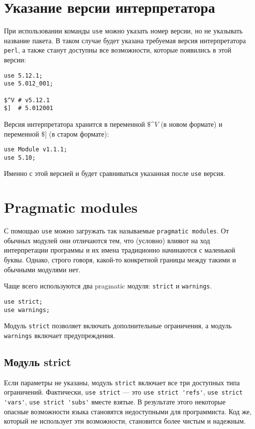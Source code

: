 \section{Указание версии интерпретатора}
При использовании команды \verb|use| можно указать номер версии, но не указывать название пакета. В таком случае будет указана требуемая версия интерпретатора \verb|perl|, а также станут доступны все возможности, которые появились в этой версии:
\begin{verbatim}
use 5.12.1;
use 5.012_001;

$^V # v5.12.1
$]  # 5.012001
\end{verbatim}
Версия интерпретатора хранится в переменной $\$\^V$ (в новом формате) и переменной $\$]$ (в старом формате):
\begin{verbatim}
use Module v1.1.1;
use 5.10;
\end{verbatim}
Именно с этой версией и будет сравниваться указанная после \verb|use| версия.

\section{Pragmatic modules} %
С помощью \verb|use| можно загружать так называемые \verb|pragmatic modules|. От обычных модулей они отличаются тем, что (условно) влияют на ход интерпретации программы и их имена традиционно начинаются с маленькой буквы. Однако, строго говоря, какой-то конкретной границы между такими и обычными модулями нет.

Чаще всего используются два pragmatic модуля: \verb|strict| и \verb|warnings|.
\begin{verbatim}
use strict;
use warnings;
\end{verbatim}
Модуль \verb|strict| позволяет включать дополнительные ограничения, а модуль \verb|warnings| включает предупреждения.

\subsection{Модуль strict} %
Если параметры не указаны, модуль \verb|strict| включает все три доступных типа ограничений. Фактически, \verb|use strict| --- это \verb|use strict 'refs'|, \verb|use strict 'vars'|, \verb|use strict 'subs'| вместе взятые. В результате этого некоторые опасные возможности языка становятся недоступными для программиста. Код же, который не использует эти возможности, становится более чистым и надежным.

